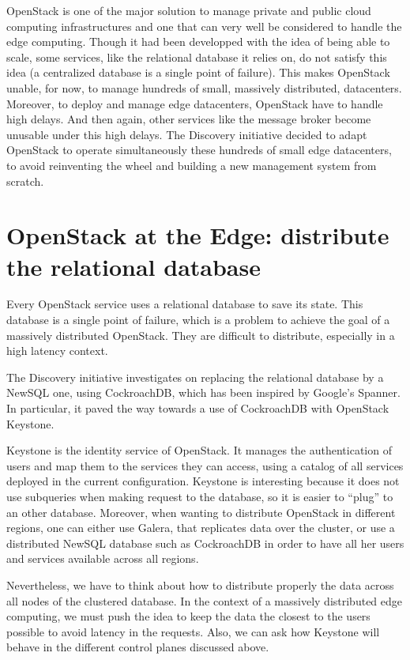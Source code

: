 OpenStack is one of the major solution to manage private and public cloud computing infrastructures and one that can very well be considered to handle the edge computing. Though it had been developped with the idea of being able to scale, some services, like the relational database it relies on, do not satisfy this idea (a centralized database is a single point of failure). This makes OpenStack unable, for now, to manage hundreds of small, massively distributed, datacenters. Moreover, to deploy and manage edge datacenters, OpenStack have to handle high delays. And then again, other services like the message broker become unusable under this high delays. The Discovery initiative decided to adapt OpenStack to operate simultaneously these hundreds of small edge datacenters, to avoid reinventing the wheel and building a new management system from scratch.




\section{OpenStack at the Edge: distribute the relational database}

Every OpenStack service uses a relational database to save its state. This database is a single point of failure, which is a problem to achieve the goal of a massively distributed OpenStack. They are difficult to distribute, especially in a high latency context.

The Discovery initiative investigates on replacing the relational database by a NewSQL one, using CockroachDB, which has been inspired by Google's Spanner\cite{CRDB:HLC}. In particular, it paved the way towards a use of CockroachDB with OpenStack Keystone.

Keystone is the identity service of OpenStack. It manages the authentication of users and map them to the services they can access, using a catalog of all services deployed in the current configuration. Keystone is interesting because it does not use subqueries when making request to the database, so it is easier to ``plug'' to an other database. Moreover, when wanting to distribute OpenStack in different regions, one can either use Galera, that replicates data over the cluster, or use a distributed NewSQL database such as CockroachDB in order to have all her users and services available across all regions.

Nevertheless, we have to think about how to distribute properly the data across all nodes of the clustered database. In the context of a massively distributed edge computing, we must push the idea to keep the data the closest to the users possible to avoid latency in the requests. Also, we can ask how Keystone will behave in the different control planes discussed above.

